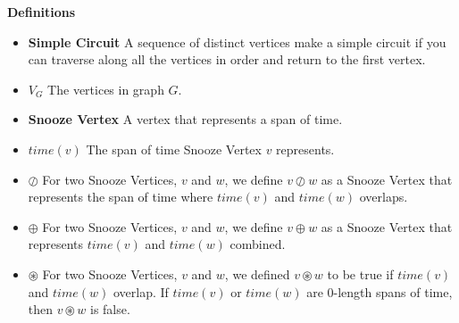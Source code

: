 \documentclass[fleqn]{article}
\begin{document}
\textbf{Definitions}
\begin{itemize}
  \item \textbf{Simple Circuit}  A sequence of distinct vertices make a 
                        simple circuit if you can traverse along
                        all the vertices in order and 
                        return to the first vertex.
  \item \textbf{$V_G$} The vertices in graph $G$.
  \item \textbf{Snooze Vertex} A vertex that represents a span of time.
  \item \textbf{$time(v)$} The span of time Snooze Vertex $v$ 
                           represents.
  \item \textbf{$\oslash$} For two Snooze Vertices, $v$ and $w$,
                           we define $v \oslash w$ as a Snooze Vertex
                           that represents the span of time where
                           $time(v)$ and $time(w)$ overlaps.
  \item \textbf{$\oplus$}  For two Snooze Vertices, $v$ and $w$,
                           we define $v \oplus w$ as a Snooze Vertex
                           that represents $time(v)$ and $time(w)$
                           combined. 
  \item \textbf{$\circledast$} For two Snooze Vertices, $v$ and $w$,
                               we defined $v \circledast w$ to be true
                               if $time(v)$ and $time(w)$ overlap.
                               If $time(v)$ or $time(w)$ are 0-length
                               spans of time, then $v \circledast w$
                               is false.
\end{itemize}
\end{document}
